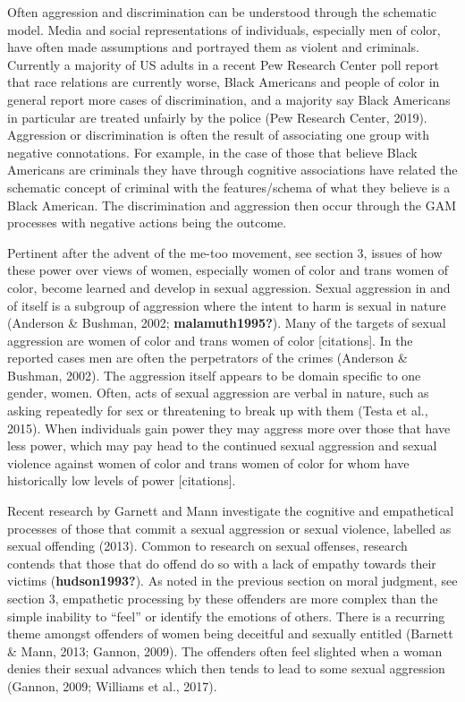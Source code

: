 \documentclass[
  english,
  donotrepeattitle,doc, 12pt, a4paper,floatsintext]{apa7}
\begin{document}
Often aggression and discrimination can be understood through the schematic model. Media and social representations of individuals, especially men of color, have often made assumptions and portrayed them as violent and criminals. Currently a majority of US adults in a recent Pew Research Center poll report that race relations are currently worse, Black Americans and people of color in general report more cases of discrimination, and a majority say Black Americans in particular are treated unfairly by the police (Pew Research Center, 2019). Aggression or discrimination is often the result of associating one group with negative connotations. For example, in the case of those that believe Black Americans are criminals they have through cognitive associations have related the schematic concept of criminal with the features/schema of what they believe is a Black American. The discrimination and aggression then occur through the GAM processes with negative actions being the outcome.

Pertinent after the advent of the me-too movement, see section 3, issues of how these power over views of women, especially women of color and trans women of color, become learned and develop in sexual aggression. Sexual aggression in and of itself is a subgroup of aggression where the intent to harm is sexual in nature (Anderson \& Bushman, 2002; \textbf{malamuth1995?}). Many of the targets of sexual aggression are women of color and trans women of color {[}citations{]}. In the reported cases men are often the perpetrators of the crimes (Anderson \& Bushman, 2002). The aggression itself appears to be domain specific to one gender, women. Often, acts of sexual aggression are verbal in nature, such as asking repeatedly for sex or threatening to break up with them (Testa et al., 2015). When individuals gain power they may aggress more over those that have less power, which may pay head to the continued sexual aggression and sexual violence against women of color and trans women of color for whom have historically low levels of power {[}citations{]}.

Recent research by Garnett and Mann investigate the cognitive and empathetical processes of those that commit a sexual aggression or sexual violence, labelled as sexual offending (2013). Common to research on sexual offenses, research contends that those that do offend do so with a lack of empathy towards their victims (\textbf{hudson1993?}). As noted in the previous section on moral judgment, see section 3, empathetic processing by these offenders are more complex than the simple inability to ``feel'' or identify the emotions of others. There is a recurring theme amongst offenders of women being deceitful and sexually entitled (Barnett \& Mann, 2013; Gannon, 2009). The offenders often feel slighted when a woman denies their sexual advances which then tends to lead to some sexual aggression (Gannon, 2009; Williams et al., 2017).
\end{document}

